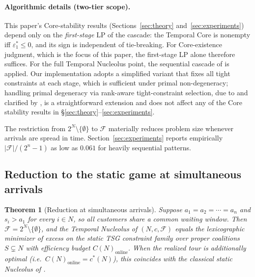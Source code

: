 \documentclass[11pt]{article}
\theoremstyle{plain}
\newtheorem{theorem}{Theorem}
\theoremstyle{definition}
\theoremstyle{remark}
\newcommand{\F}{\mathcal{F}}
\newcommand{\cstar}{c^{\ast}}
\begin{document}
\paragraph{Algorithmic details (two-tier scope).} This paper's Core-stability results (Sections~\ref{sec:theory} and~\ref{sec:experiments}) depend only on the \emph{first-stage} LP of the cascade: the Temporal Core is nonempty iff $\varepsilon_1^{\ast}\le 0$, and its sign is independent of tie-breaking. For Core-existence judgment, which is the focus of this paper, the first-stage LP alone therefore suffices. For the full Temporal Nucleolus point, the sequential cascade of \citet{guajardo2015nucleolus} is applied. Our implementation adopts a simplified variant that fixes all tight constraints at each stage, which is sufficient under primal non-degeneracy; handling primal degeneracy via rank-aware tight-constraint selection, due to \citet{kopelowitz1967computation} and clarified by \citet{guajardo2015nucleolus}, is a straightforward extension and does not affect any of the Core stability results in \S\ref{sec:theory}--\ref{sec:experiments}.

The restriction from $2^N\setminus\{\emptyset\}$ to $\F$ materially reduces problem size whenever arrivals are spread in time. Section~\ref{sec:experiments} reports empirically $|\F|/(2^n-1)$ as low as $0.061$ for heavily sequential patterns.

\subsection{Reduction to the static game at simultaneous arrivals}

\begin{theorem}[Reduction at simultaneous arrivals]
\label{thm:static-equiv}
Suppose $a_1 = a_2 = \cdots = a_n$ and $s_i > a_1$ for every $i\in N$, so all customers share a common waiting window. Then $\F = 2^N\setminus\{\emptyset\}$, and the Temporal Nucleolus of $(N,c,\F)$ equals the lexicographic minimizer of excess on the static TSG constraint family over proper coalitions $S\subsetneq N$ with efficiency budget $C(N)_{\text{online}}$. When the realized tour is additionally optimal (i.e.\ $C(N)_{\text{online}}=\cstar(N)$), this coincides with the classical static Nucleolus of \citet{potters1992tsg}.
\end{theorem}
\end{document}
